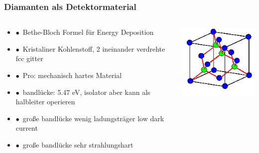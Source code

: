 \documentclass[aspectratio=1610, 12pt, xcolor=dvipsnames]{beamer}
\begin{document}
\begin{frame}\frametitle{Diamanten als Detektormaterial}
  \begin{columns}
    \begin{column}[c]{0.58\textwidth}
      \begin{itemize}
        \item $\bullet$\, Bethe-Bloch Formel für Energy Deposition
        \item $\bullet$\, Kristaliner Kohlenstoff, 2 ineinander verdrehte fcc gitter
        \item $\bullet$\, Pro: mechanisch hartes Material
        \item $\bullet$\, bandlücke: 5.47 eV, isolator aber kann als halbleiter operieren
        \item $\bullet$\, große bandlücke \to wenig ladungsträger \to low dark current
        \item $\bullet$\, große bandlücke \to sehr strahlungshart
      \end{itemize}
    \end{column}
    \begin{column}[c]{0.38\textwidth}
      \includegraphics[width=\textwidth]{plots/dia.png}
    \end{column}
  \end{columns}
\end{frame}
\end{document}
